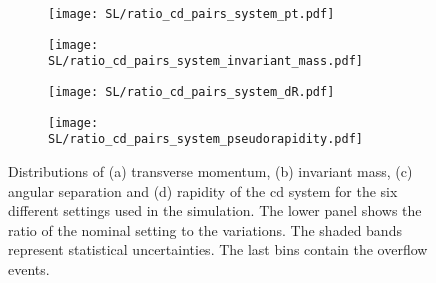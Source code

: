 \begin{figure}[H]
    \centering
    \begin{subfigure}{0.49\textwidth}
        \centering
        \texttt{[image: SL/ratio\_cd\_pairs\_system\_pt.pdf]}
        \caption{}
        \label{app:subfig:pt(cd)_SL}
    \end{subfigure}
    \begin{subfigure}{0.49\textwidth}
        \centering
        \texttt{[image: SL/ratio\_cd\_pairs\_system\_invariant\_mass.pdf]}
        \caption{}
        \label{app:subfig:m(cd)_SL}
    \end{subfigure}

    \vspace{0.2cm}
    
    \begin{subfigure}{0.49\textwidth}
        \centering
        \texttt{[image: SL/ratio\_cd\_pairs\_system\_dR.pdf]}
        \caption{}
        \label{app:subfig:dR(cd)_SL}
    \end{subfigure}
    \begin{subfigure}{0.49\textwidth}
        \centering
        \texttt{[image: SL/ratio\_cd\_pairs\_system\_pseudorapidity.pdf]}
        \caption{}
        \label{app:subfig:y(cd)_SL}
    \end{subfigure}
    \caption{Distributions of (a) transverse momentum, (b) invariant mass,  (c) angular separation and (d) rapidity of the cd system for the six different settings used in the simulation. The lower panel shows the ratio of the nominal setting to the variations. The shaded bands represent statistical uncertainties. The last bins contain the overflow events.}
    \label{app:fig:cd_SL}
\end{figure}


